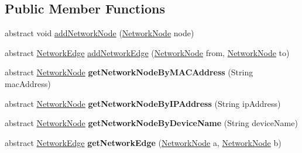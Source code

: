 \subsection*{Public Member Functions}
\begin{DoxyCompactItemize}
\item 
abstract void \hyperlink{classedu_1_1kit_1_1trufflehog_1_1model_1_1graph_1_1_abstract_network_graph_a856bebd1d38f01b33940f1e022098083}{add\+Network\+Node} (\hyperlink{classedu_1_1kit_1_1trufflehog_1_1model_1_1graph_1_1_network_node}{Network\+Node} node)
\item 
abstract \hyperlink{classedu_1_1kit_1_1trufflehog_1_1model_1_1graph_1_1_network_edge}{Network\+Edge} \hyperlink{classedu_1_1kit_1_1trufflehog_1_1model_1_1graph_1_1_abstract_network_graph_a9016b664c89cc2cee09d15699fa89bdf}{add\+Network\+Edge} (\hyperlink{classedu_1_1kit_1_1trufflehog_1_1model_1_1graph_1_1_network_node}{Network\+Node} from, \hyperlink{classedu_1_1kit_1_1trufflehog_1_1model_1_1graph_1_1_network_node}{Network\+Node} to)
\item 
\hypertarget{classedu_1_1kit_1_1trufflehog_1_1model_1_1graph_1_1_abstract_network_graph_a1ad8850d99c26e6a032d056080dbbe58}{}abstract \hyperlink{classedu_1_1kit_1_1trufflehog_1_1model_1_1graph_1_1_network_node}{Network\+Node} {\bfseries get\+Network\+Node\+By\+M\+A\+C\+Address} (String mac\+Address)\label{classedu_1_1kit_1_1trufflehog_1_1model_1_1graph_1_1_abstract_network_graph_a1ad8850d99c26e6a032d056080dbbe58}

\item 
\hypertarget{classedu_1_1kit_1_1trufflehog_1_1model_1_1graph_1_1_abstract_network_graph_ab0462af70f25673374a4416106fd9786}{}abstract \hyperlink{classedu_1_1kit_1_1trufflehog_1_1model_1_1graph_1_1_network_node}{Network\+Node} {\bfseries get\+Network\+Node\+By\+I\+P\+Address} (String ip\+Address)\label{classedu_1_1kit_1_1trufflehog_1_1model_1_1graph_1_1_abstract_network_graph_ab0462af70f25673374a4416106fd9786}

\item 
\hypertarget{classedu_1_1kit_1_1trufflehog_1_1model_1_1graph_1_1_abstract_network_graph_a55bc65f98505b2be80a558933292874d}{}abstract \hyperlink{classedu_1_1kit_1_1trufflehog_1_1model_1_1graph_1_1_network_node}{Network\+Node} {\bfseries get\+Network\+Node\+By\+Device\+Name} (String device\+Name)\label{classedu_1_1kit_1_1trufflehog_1_1model_1_1graph_1_1_abstract_network_graph_a55bc65f98505b2be80a558933292874d}

\item 
\hypertarget{classedu_1_1kit_1_1trufflehog_1_1model_1_1graph_1_1_abstract_network_graph_a288fa095ad352b29c332046411df91fb}{}abstract \hyperlink{classedu_1_1kit_1_1trufflehog_1_1model_1_1graph_1_1_network_edge}{Network\+Edge} {\bfseries get\+Network\+Edge} (\hyperlink{classedu_1_1kit_1_1trufflehog_1_1model_1_1graph_1_1_network_node}{Network\+Node} a, \hyperlink{classedu_1_1kit_1_1trufflehog_1_1model_1_1graph_1_1_network_node}{Network\+Node} b)\label{classedu_1_1kit_1_1trufflehog_1_1model_1_1graph_1_1_abstract_network_graph_a288fa095ad352b29c332046411df91fb}

\end{DoxyCompactItemize}


